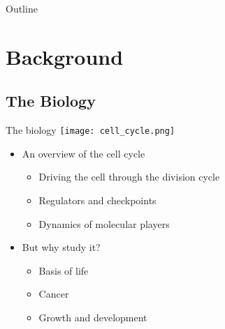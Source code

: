 \date{9th Dec, 2015}







\begin{frame}
  \titlepage
\end{frame}

\begin{frame}{Outline}
  \tableofcontents
\end{frame}

\section{Background}

\subsection{The Biology}
\begin{frame}{The biology}
\texttt{[image: cell\_cycle.png]}
  \begin{itemize} 
\item An overview of the cell cycle 
\begin{itemize}
  \item{    Driving the cell through the division cycle  }
  \item{Regulators and checkpoints}
  \item{   Dynamics of molecular players}
  \end{itemize}
\item But why study it?	

\begin{itemize}
  \item{  Basis of life}

  \item{  Cancer}

  \item{  Growth and development}
\end{itemize}
\end{itemize}
\end{frame}
